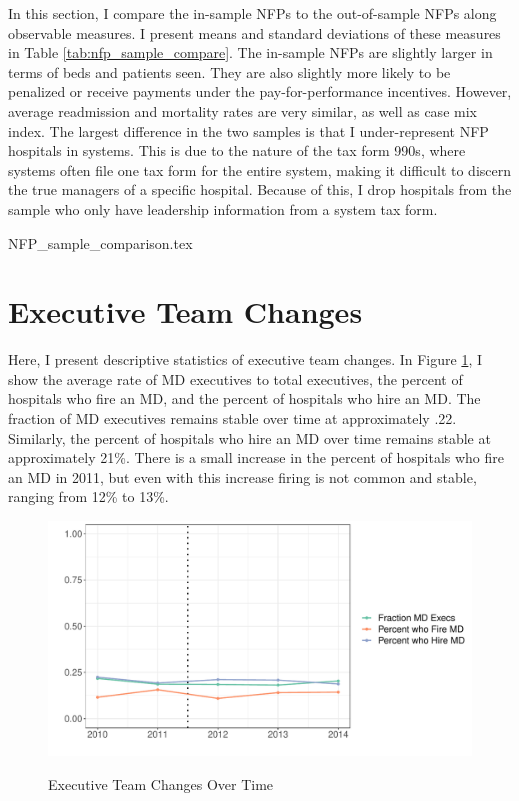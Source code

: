 \documentclass[12pt]{article}
\begin{document}
In this section, I compare the in-sample NFPs to the out-of-sample NFPs along observable measures. I present means and standard deviations of these measures in Table \ref{tab:nfp_sample_compare}. The in-sample NFPs are slightly larger in terms of beds and patients seen. They are also slightly more likely to be penalized or receive payments under the pay-for-performance incentives. However, average readmission and mortality rates are very similar, as well as case mix index. The largest difference in the two samples is that I under-represent NFP hospitals in systems. This is due to the nature of the tax form 990s, where systems often file one tax form for the entire system, making it difficult to discern the true managers of a specific hospital. Because of this, I drop hospitals from the sample who only have leadership information from a system tax form. 

{NFP_sample_comparison.tex}


\section{Executive Team Changes}\label{app:changes}

Here, I present descriptive statistics of executive team changes. In Figure \ref{fig:change_graph}, I show the average rate of MD executives to total executives, the percent of hospitals who fire an MD, and the percent of hospitals who hire an MD. The fraction of MD executives remains stable over time at approximately .22. Similarly, the percent of hospitals who hire an MD over time remains stable at approximately 21\%. There is a small increase in the percent of hospitals who fire an MD in 2011, but even with this increase firing is not common and stable, ranging from 12\% to 13\%. 

\begin{figure}[ht!]
    \centering
    \caption{Executive Team Changes Over Time}
    \includegraphics[width=\textwidth]{Objects/change_graph.pdf}
    \label{fig:change_graph}
\end{figure}
\end{document}
